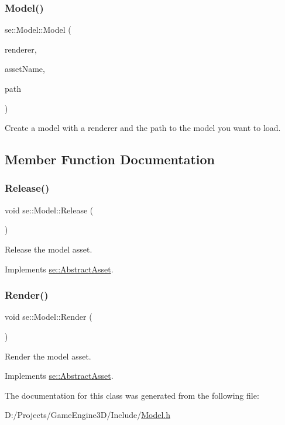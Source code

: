 \subsubsection{\texorpdfstring{Model()}{Model()}}
{\footnotesize\ttfamily se\+::\+Model\+::\+Model (\begin{DoxyParamCaption}\item[{\mbox{\hyperlink{classse_1_1_abstract_renderer}{Abstract\+Renderer}} $\ast$}]{renderer,  }\item[{const std\+::string \&}]{asset\+Name,  }\item[{const std\+::string \&}]{path }\end{DoxyParamCaption})}

Create a model with a renderer and the path to the model you want to load. 

\subsection{Member Function Documentation}
\mbox{\label{classse_1_1_model_a0c1ecdbb68d2fb655e33e63ed35ddc4c}} 
\subsubsection{\texorpdfstring{Release()}{Release()}}
{\footnotesize\ttfamily void se\+::\+Model\+::\+Release (\begin{DoxyParamCaption}{ }\end{DoxyParamCaption})\hspace{0.3cm}{\ttfamily [virtual]}}

Release the model asset. 

Implements \mbox{\hyperlink{classse_1_1_abstract_asset_aea97e36f647efdb07a801b6fc468388d}{se\+::\+Abstract\+Asset}}.

\mbox{\label{classse_1_1_model_a8f7aeee14ed8e5c63f8f58451d8e1d19}} 
\subsubsection{\texorpdfstring{Render()}{Render()}}
{\footnotesize\ttfamily void se\+::\+Model\+::\+Render (\begin{DoxyParamCaption}{ }\end{DoxyParamCaption})\hspace{0.3cm}{\ttfamily [virtual]}}

Render the model asset. 

Implements \mbox{\hyperlink{classse_1_1_abstract_asset_a2addad2ca18a3ffbcbe1e80afa0ad56c}{se\+::\+Abstract\+Asset}}.



The documentation for this class was generated from the following file\+:\begin{DoxyCompactItemize}
\item 
D\+:/\+Projects/\+Game\+Engine3\+D/\+Include/\mbox{\hyperlink{_model_8h}{Model.\+h}}\end{DoxyCompactItemize}
